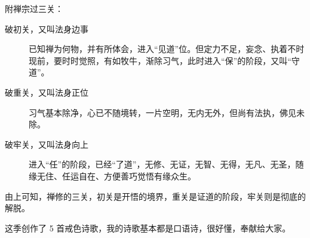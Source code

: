 \documentclass{ctexart}
\begin{document}
附禅宗过三关：

\begin{description}
    \item[破初关，又叫法身边事] 已知禅为何物，并有所体会，进入“见道”位。但定力不足，妄念、执着不时现前，要时时觉照，有如牧牛，渐除习气，此时进入“保”的阶段，又叫“守道”。
    \item[破重关，又叫法身正位] 习气基本除净，心已不随境转，一片空明，无内无外，但尚有法执，佛见未除。
    \item[破牢关，又叫法身向上] 进入“任”的阶段，已经“了道”，无修、无证，无智、无得，无凡、无圣，随缘无住、任运自在、方便善巧觉悟有缘众生。
\end{description}

由上可知，禅修的三关，初关是开悟的境界，重关是证道的阶段，牢关则是彻底的解脱。

这季创作了 5 首戒色诗歌，我的诗歌基本都是口语诗，很好懂，奉献给大家。
\end{document}
